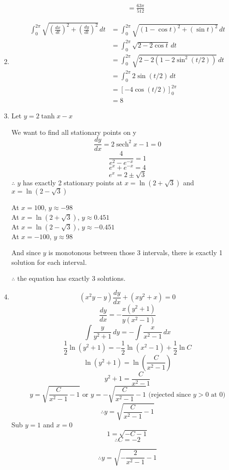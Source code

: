 \documentclass[12pt]{article}
\DeclareMathOperator{\sech}{sech}
\theoremstyle{definition}
\begin{document}
\begin{enumerate}
\begin{enumerate}
\begin{align*}
                            &= \frac{63\pi}{512}
                      \end{align*}
              \end{enumerate}
  \item \begin{align*}
          \int_0^{2\pi}\sqrt{\left(\frac{dx}{dt}\right)^2+\left(\frac{dy}{dt}\right)^2}\,dt &= \int_0^{2\pi}\sqrt{(1-\cos t)^2+(\sin t)^2}\,dt \\
            &= \int_0^{2\pi}\sqrt{2-2\cos t}\,dt \\
            &= \int_0^{2\pi}\sqrt{2-2(1-2\sin^2(t/2))}\,dt \\
            &= \int_0^{2\pi} 2\sin(t/2)\,dt \\
            &= [-4\cos(t/2)]_0^{2\pi} \\
            &= 8
        \end{align*}
  \item Let $y = 2\tanh x - x$
  
        We want to find all stationary points on y
        \[\frac{dy}{dx} = 2\sech ^2 x-1 = 0\]
        \[\frac{4}{e^2-e^{-x}}=1\]
        \[e^x+e^{-x}=4\]
        \[e^x = 2\pm \sqrt{3}\]
        $\therefore$ $y$ has exactly 2 stationary points at $x=\ln(2+\sqrt{3})$ and $x=\ln(2-\sqrt{3})$
        
        At $x=100$, $y\approx -98$ \\
        At $x=\ln(2+\sqrt{3})$, $y\approx 0.451$ \\
        At $x=\ln(2-\sqrt{3})$, $y\approx -0.451$ \\
        At $x=-100$, $y\approx 98$
        
        And since $y$ is monotonous between those 3 intervals, there is exactly 1 solution for each interval.
        
        $\therefore$ the equation has exactly 3 solutions.
  \item \[(x^2y-y)\frac{dy}{dx}+(xy^2+x)=0\]
        \[\frac{dy}{dx} = -\frac{x(y^2+1)}{y(x^2-1)}\]
        \[\int \frac{y}{y^2+1}\,dy = -\int \frac{x}{x^2-1}\,dx\]
        \[\frac{1}{2}\ln(y^2+1) = -\frac{1}{2}\ln(x^2-1) + \frac{1}{2}\ln C\]
        \[\ln(y^2+1) = \ln\left(\frac{C}{x^2-1}\right)\]
        \[y^2+1 = \frac{C}{x^2-1}\]
        \[y = \sqrt{\frac{C}{x^2-1} - 1} \text{ or } y = -\sqrt{\frac{C}{x^2-1} - 1} \text{ (rejected since $y>0$ at 0)}\]
        \[\therefore y = \sqrt{\frac{C}{x^2-1} - 1}\]
        Sub $y=1$ and $x=0$
        \[1 = \sqrt{-C - 1}\]
        \[\therefore C=-2\]
        
        \[\therefore y = \sqrt{-\frac{2}{x^2-1} - 1}\]
        
\end{enumerate}
\end{document}
